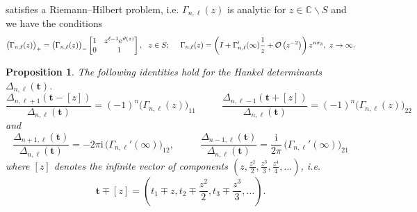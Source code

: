 \documentclass[10pt,reqno,oneside]{amsart}
\newcommand{\im}{\mathrm{i}}
\numberwithin{equation}{section}
\newtheorem{theo}{Theorem}[section]
\newtheorem{proposition}[theo]{Proposition}
\def\bt{\begin{theo}}
\def\bp{\begin{proposition}}
\def\ep{\end{proposition}}
\def\bt{{\mathbf t}}
\begin{document}
satisfies a Riemann--Hilbert problem, i.e. $\Gamma_{n,\ell}(z)$ is analytic for $z\in\mathbb{C}\backslash S$ and we have the conditions
\begin{equation*}
\big(\Gamma_{n,\ell}(z)\big)_+ = \big(\Gamma_{n,\ell}(z)\big)_- \begin{bmatrix}
1 & z^{\ell-1}{\rm e}^{\vartheta(z)}\\
0 & 1
\end{bmatrix},\ \ z\in S;\ \ \ \ \Gamma_{n,\ell}(z)=\left(I+\Gamma'_{n,\ell}(\infty)\frac{1}{z}+\mathcal{O}\left(z^{-2}\right)\right)z^{n\sigma_3},\ z\rightarrow\infty.
\end{equation*}

\bp
\label{Satoid}
The following identities hold for the Hankel determinants $\Delta_{n,\ell}(\bt)$.
\begin{equation}
\frac{\Delta_{n,\ell+1}( \bt-[z])}{\Delta_{n, \ell}(\bt)} = (-1)^n\big(\Gamma_{n,\ell}(z)\big)_{11} \ \qquad \ \ 
\frac{\Delta_{n,\ell-1}( \bt+[z])}{\Delta_{n, \ell}(\bt)} = (-1)^n\big(\Gamma_{n,\ell}(z)\big) _{22}
\label{satodelta}
\end{equation}
and
\begin{equation}
\frac{\Delta_{n+1,\ell}(\bt)}{\Delta_{n,\ell}(\bt)}  = -2\pi\im\,\big(\Gamma_{n,\ell}'(\infty)\big)_{12},\ \qquad \ \
\frac{\Delta_{n-1,\ell}(\bt)}{\Delta_{n,\ell}(\bt)}  = \frac{\im}{2\pi}\,\big(\Gamma_{n,\ell}'(\infty)\big)_{21}
\label{standard}
\end{equation}
where $[z]$ denotes the infinite vector of components $(z, \frac {z^2}2, \frac {z^3}3, \frac {z^4}4,\ldots)$, i.e. 
\begin{equation*}
	\bt\mp[z]=\left(t_1\mp z,t_2\mp\frac{z^2}{2},t_3\mp\frac{z^3}{3},\ldots\right).
\end{equation*}
\ep
\end{document}
